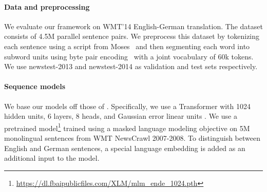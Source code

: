 \documentclass{article}
\begin{document}
\paragraph{Data and preprocessing}

We evaluate our framework on WMT'14 English-German translation.
The dataset consists of 4.5M parallel sentence pairs.
We preprocess this dataset by tokenizing each sentence using a script from Moses~\citep{koehn2007moses} and then segmenting each word into subword units using byte pair encoding~\citep{sennrich2016bpe} with a joint vocabulary of 60k tokens. We use newstest-2013 and newstest-2014 as validation and test sets respectively. 


\paragraph{Sequence models} 

We base our models off those of \citet{lample2019cross}.
Specifically, we use a Transformer \citep{vaswani2017attention} with 1024 hidden units, 6 layers, 8 heads, and Gaussian error linear units  \citep{hendrycks2016gelu}.
We use a pretrained model\footnote{ \url{https://dl.fbaipublicfiles.com/XLM/mlm_ende_1024.pth}} trained using a masked language modeling objective \citep{lample2019cross} on 5M monolingual sentences from WMT NewsCrawl 2007-2008.
To distinguish between English and German sentences, a special language embedding is added as an additional input to the model. 
\end{document}

